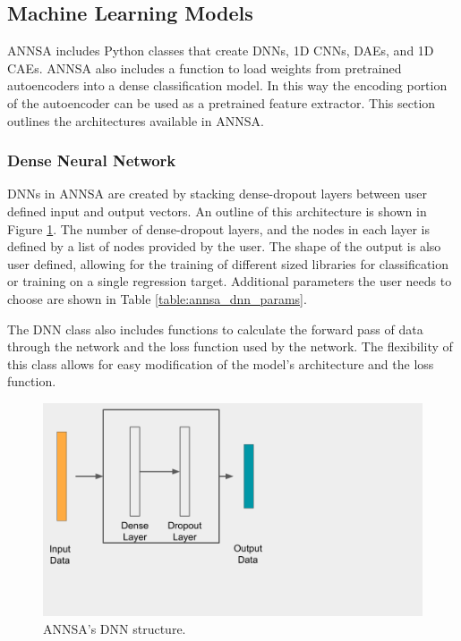 \subsection{Machine Learning Models}

ANNSA includes Python classes that create DNNs, 1D CNNs, DAEs, and 1D CAEs. ANNSA also includes a function to load weights from pretrained autoencoders into a dense classification model. In this way the encoding portion of the autoencoder can be used as a pretrained feature extractor. This section outlines the architectures available in ANNSA.

\subsubsection{Dense Neural Network}

DNNs in ANNSA are created by stacking dense-dropout layers between user defined input and output vectors. An outline of this architecture is shown in Figure \ref{fig:annsa_dnn}. The number of dense-dropout layers, and the nodes in each layer is defined by a list of nodes provided by the user. The shape of the output is also user defined, allowing for the training of different sized libraries for classification or training on a single regression target. Additional parameters the user needs to choose are shown in Table \ref{table:annsa_dnn_params}. 

The DNN class also includes functions to calculate the forward pass of data through the network and the loss function used by the network. The flexibility of this class allows for easy modification of the model's architecture and the loss function.

\begin{figure}[H]
\centering
\includegraphics[trim=0 110 400 0,clip,width=0.6\linewidth]{images/annsa_dnn.png}
\caption{ANNSA's DNN structure.}
\label{fig:annsa_dnn}
\end{figure}

